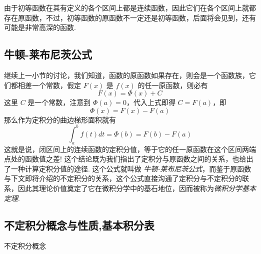 由于初等函数在其有定义的各个区间上都是连续函数，因此它们在各个区间上就都存在原函数，不过，初等函数的原函数不一定还是初等函数，后面将会见到，还有可能是非常高深的函数.


\subsection{牛顿-莱布尼茨公式}
\label{sec:newton-leibniz-formular}

继续上一小节的讨论，我们知道，函数的原函数如果存在，则会是一个函数族，它们都相差一个常数，假定 $F(x)$ 是 $f(x)$ 的任一原函数，则必有
\[ F(x) = \Phi(x) +C \]
这里 $C$ 是一个常数，注意到 $\Phi(a)=0$，代入上式即得 $C=F(a)$，即
\[ \Phi(x) = F(x) - F(a) \]
那么作为定积分的曲边梯形面积就有
\[ \int_a^{b}f(t)dt = \Phi(b) = F(b) - F(a) \]
这就是说，闭区间上的连续函数的定积分值，等于它的任一原函数在这个区间两端点处的函数值之差! 这个结论既为我们指出了定积分与原函数之间的关系，也给出了一种计算定积分值的途径. 这个公式就叫做 \emph{牛顿-莱布尼茨公式}，而鉴于原函数与下文即将介绍的不定积分的关系，这个公式直接沟通了定积分与不定积分的联系，因此其理论价值奠定了它在微积分学中的基石地位，因而被称为\emph{微积分学基本定理}.


\subsection{不定积分概念与性质,基本积分表}
\label{sec:indefinite-integral}

不定积分概念












